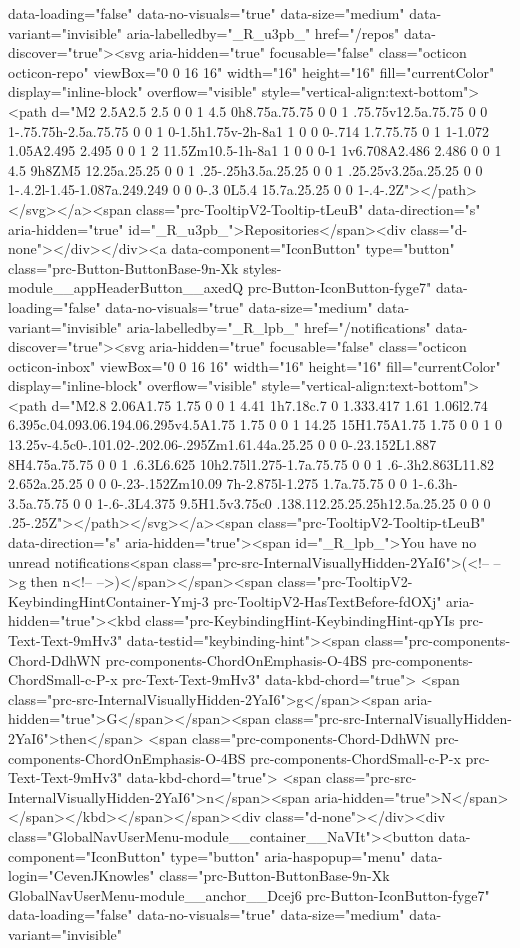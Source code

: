 {{data-loading="false" data-no-visuals="true" data-size="medium" data-variant="invisible" aria-labelledby="_R_u3pb_" href="/repos" data-discover="true"><svg aria-hidden="true" focusable="false" class="octicon octicon-repo" viewBox="0 0 16 16" width="16" height="16" fill="currentColor" display="inline-block" overflow="visible" style="vertical-align:text-bottom"><path d="M2 2.5A2.5 2.5 0 0 1 4.5 0h8.75a.75.75 0 0 1 .75.75v12.5a.75.75 0 0 1-.75.75h-2.5a.75.75 0 0 1 0-1.5h1.75v-2h-8a1 1 0 0 0-.714 1.7.75.75 0 1 1-1.072 1.05A2.495 2.495 0 0 1 2 11.5Zm10.5-1h-8a1 1 0 0 0-1 1v6.708A2.486 2.486 0 0 1 4.5 9h8ZM5 12.25a.25.25 0 0 1 .25-.25h3.5a.25.25 0 0 1 .25.25v3.25a.25.25 0 0 1-.4.2l-1.45-1.087a.249.249 0 0 0-.3 0L5.4 15.7a.25.25 0 0 1-.4-.2Z"></path></svg></a><span class="prc-TooltipV2-Tooltip-tLeuB" data-direction="s" aria-hidden="true" id="_R_u3pb_">Repositories</span><div class="d-none"></div></div><a data-component="IconButton" type="button" class="prc-Button-ButtonBase-9n-Xk styles-module__appHeaderButton__axedQ prc-Button-IconButton-fyge7" data-loading="false" data-no-visuals="true" data-size="medium" data-variant="invisible" aria-labelledby="_R_lpb_" href="/notifications" data-discover="true"><svg aria-hidden="true" focusable="false" class="octicon octicon-inbox" viewBox="0 0 16 16" width="16" height="16" fill="currentColor" display="inline-block" overflow="visible" style="vertical-align:text-bottom"><path d="M2.8 2.06A1.75 1.75 0 0 1 4.41 1h7.18c.7 0 1.333.417 1.61 1.06l2.74 6.395c.04.093.06.194.06.295v4.5A1.75 1.75 0 0 1 14.25 15H1.75A1.75 1.75 0 0 1 0 13.25v-4.5c0-.101.02-.202.06-.295Zm1.61.44a.25.25 0 0 0-.23.152L1.887 8H4.75a.75.75 0 0 1 .6.3L6.625 10h2.75l1.275-1.7a.75.75 0 0 1 .6-.3h2.863L11.82 2.652a.25.25 0 0 0-.23-.152Zm10.09 7h-2.875l-1.275 1.7a.75.75 0 0 1-.6.3h-3.5a.75.75 0 0 1-.6-.3L4.375 9.5H1.5v3.75c0 .138.112.25.25.25h12.5a.25.25 0 0 0 .25-.25Z"></path></svg></a><span class="prc-TooltipV2-Tooltip-tLeuB" data-direction="s" aria-hidden="true"><span id="_R_lpb_">You have no unread notifications<span class="prc-src-InternalVisuallyHidden-2YaI6">(<!-- -->g then n<!-- -->)</span></span><span class="prc-TooltipV2-KeybindingHintContainer-Ymj-3 prc-TooltipV2-HasTextBefore-fdOXj" aria-hidden="true"><kbd class="prc-KeybindingHint-KeybindingHint-qpYIs prc-Text-Text-9mHv3" data-testid="keybinding-hint"><span class="prc-components-Chord-DdhWN prc-components-ChordOnEmphasis-O-4BS prc-components-ChordSmall-c-P-x prc-Text-Text-9mHv3" data-kbd-chord="true"> <span class="prc-src-InternalVisuallyHidden-2YaI6">g</span><span aria-hidden="true">G</span></span><span class="prc-src-InternalVisuallyHidden-2YaI6">then</span> <span class="prc-components-Chord-DdhWN prc-components-ChordOnEmphasis-O-4BS prc-components-ChordSmall-c-P-x prc-Text-Text-9mHv3" data-kbd-chord="true"> <span class="prc-src-InternalVisuallyHidden-2YaI6">n</span><span aria-hidden="true">N</span></span></kbd></span></span><div class="d-none"></div><div class="GlobalNavUserMenu-module__container__NaVIt"><button data-component="IconButton" type="button" aria-haspopup="menu" data-login="CevenJKnowles" class="prc-Button-ButtonBase-9n-Xk GlobalNavUserMenu-module__anchor__Dcej6 prc-Button-IconButton-fyge7" data-loading="false" data-no-visuals="true" data-size="medium" data-variant="invisible" }}
